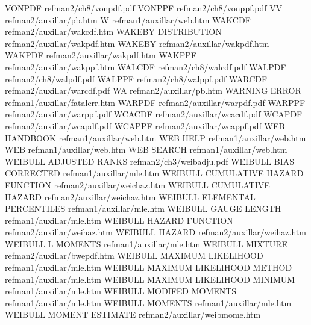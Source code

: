 VONPDF                                  refman2/ch8/vonpdf.pdf
VONPPF                                  refman2/ch8/vonppf.pdf
VV                                      refman2/auxillar/pb.htm
W                                       refman1/auxillar/web.htm
WAKCDF                                  refman2/auxillar/wakcdf.htm
WAKEBY DISTRIBUTION                     refman2/auxillar/wakpdf.htm
WAKEBY                                  refman2/auxillar/wakpdf.htm
WAKPDF                                  refman2/auxillar/wakpdf.htm
WAKPPF                                  refman2/auxillar/wakppf.htm
WALCDF                                  refman2/ch8/walcdf.pdf
WALPDF                                  refman2/ch8/walpdf.pdf
WALPPF                                  refman2/ch8/walppf.pdf
WARCDF                                  refman2/auxillar/warcdf.pdf
WA                                      refman2/auxillar/pb.htm
WARNING ERROR                           refman1/auxillar/fatalerr.htm
WARPDF                                  refman2/auxillar/warpdf.pdf
WARPPF                                  refman2/auxillar/warppf.pdf
WCACDF                                  refman2/auxillar/wcacdf.pdf
WCAPDF                                  refman2/auxillar/wcapdf.pdf
WCAPPF                                  refman2/auxillar/wcappf.pdf
WEB HANDBOOK                            refman1/auxillar/web.htm
WEB HELP                                refman1/auxillar/web.htm
WEB                                     refman1/auxillar/web.htm
WEB SEARCH                              refman1/auxillar/web.htm
WEIBULL ADJUSTED RANKS                  refman2/ch3/weibadju.pdf
WEIBULL BIAS CORRECTED                  refman1/auxillar/mle.htm
WEIBULL CUMULATIVE HAZARD FUNCTION      refman2/auxillar/weichaz.htm
WEIBULL CUMULATIVE HAZARD               refman2/auxillar/weichaz.htm
WEIBULL ELEMENTAL PERCENTILES           refman1/auxillar/mle.htm
WEIBULL GAUGE LENGTH                    refman1/auxillar/mle.htm
WEIBULL HAZARD FUNCTION                 refman2/auxillar/weihaz.htm
WEIBULL HAZARD                          refman2/auxillar/weihaz.htm
WEIBULL L MOMENTS                       refman1/auxillar/mle.htm
WEIBULL MIXTURE                         refman2/auxillar/bwepdf.htm
WEIBULL MAXIMUM LIKELIHOOD              refman1/auxillar/mle.htm
WEIBULL MAXIMUM LIKELIHOOD METHOD       refman1/auxillar/mle.htm
WEIBULL MAXIMUM LIKELIHOOD MINIMUM      refman1/auxillar/mle.htm
WEIBULL MODIFED MOMENTS                 refman1/auxillar/mle.htm
WEIBULL MOMENTS                         refman1/auxillar/mle.htm
WEIBULL MOMENT ESTIMATE                 refman2/auxillar/weibmome.htm
